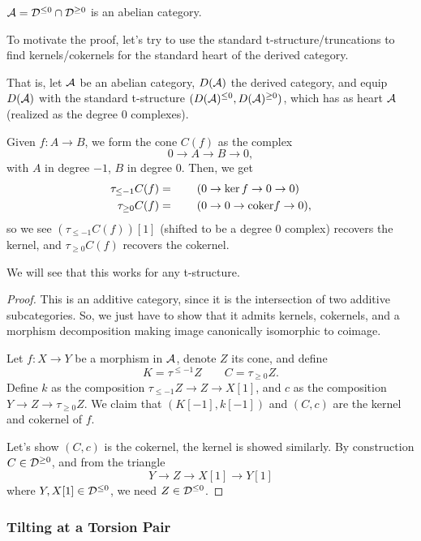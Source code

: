 \documentclass[12pt]{article}
\begin{document}
\begin{thm}
    $\mathcal{A} = \mathcal{D}^{\leq 0} \cap \mathcal{D}^{\geq 0}$ is an abelian category.
\end{thm}

\begin{eg}
    To motivate the proof, let's try to use the standard t-structure/truncations to find kernels/cokernels for the standard heart of the derived category.

    That is, let $\mathcal{A}$ be an abelian category, $D(\mathcal{A})$ the derived category, and equip $D(\mathcal{A})$ with the standard t-structure $(D(\mathcal{A})^{\leq 0}, D(\mathcal{A})^{\geq 0})$, which has as heart $\mathcal{A}$ (realized as the degree 0 complexes).
    
    Given $f:A\to B$, we form the cone $C(f)$ as the complex
    \[0\to A\to B \to 0,\]
    with $A$ in degree $-1$, $B$ in degree $0$. Then, we get
    \begin{align*}
        \tau_{\leq -1} C(f) &= \qquad (0 \to \ker f \to 0 \to 0)\\
        \tau_{\geq 0} C(f) &= \qquad (0 \to 0 \to \mathrm{coker} f \to 0),
    \end{align*}
    so we see $(\tau_{\leq -1} C(f))[1]$ (shifted to be a degree 0 complex) recovers the kernel, and $\tau_{\geq 0} C(f)$ recovers the cokernel.

    We will see that this works for any t-structure.
\end{eg}

\begin{proof}
    This is an additive category, since it is the intersection of two additive subcategories. So, we just have to show that it admits kernels, cokernels, and a morphism decomposition making image canonically isomorphic to coimage.

    Let $f:X\to Y$ be a morphism in $\mathcal{A}$, denote $Z$ its cone, and define
    \[K = \tau^{\leq -1} Z \qquad C = \tau_{\geq 0} Z.\]
    Define $k$ as the composition $\tau_{\leq -1} Z \to Z \to X[1]$, and $c$ as the composition $Y\to Z\to \tau_{\geq 0} Z$. We claim that $(K[-1],k[-1])$ and $(C,c)$ are the kernel and cokernel of $f$.

    Let's show $(C,c)$ is the cokernel, the kernel is showed similarly. By construction $C\in \mathcal{D}^{\geq 0}$, and from the triangle
    \[Y \to Z \to X[1] \to Y[1]\]
    where $Y,X[1]\in \mathcal{D}^{\leq 0}$, we need $Z\in \mathcal{D}^{\leq 0}$.
\end{proof}

\subsubsection{Tilting at a Torsion Pair}
\end{document}
